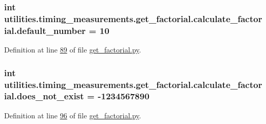 \subsubsection[{default\+\_\+number}]{\setlength{\rightskip}{0pt plus 5cm}int utilities.\+timing\+\_\+measurements.\+get\+\_\+factorial.\+calculate\+\_\+factorial.\+default\+\_\+number = 10\hspace{0.3cm}{\ttfamily [static]}}\label{classutilities_1_1timing__measurements_1_1get__factorial_1_1calculate__factorial_a52e3407bbd93719d9c77e49706a47362}


Definition at line \hyperlink{get__factorial_8py_source_l00089}{89} of file \hyperlink{get__factorial_8py_source}{get\+\_\+factorial.\+py}.

\hypertarget{classutilities_1_1timing__measurements_1_1get__factorial_1_1calculate__factorial_a16363bc4d672d6352ce3618abeb8e74f}{}
\subsubsection[{does\+\_\+not\+\_\+exist}]{\setlength{\rightskip}{0pt plus 5cm}int utilities.\+timing\+\_\+measurements.\+get\+\_\+factorial.\+calculate\+\_\+factorial.\+does\+\_\+not\+\_\+exist = -\/1234567890\hspace{0.3cm}{\ttfamily [static]}}\label{classutilities_1_1timing__measurements_1_1get__factorial_1_1calculate__factorial_a16363bc4d672d6352ce3618abeb8e74f}


Definition at line \hyperlink{get__factorial_8py_source_l00096}{96} of file \hyperlink{get__factorial_8py_source}{get\+\_\+factorial.\+py}.

\hypertarget{classutilities_1_1timing__measurements_1_1get__factorial_1_1calculate__factorial_a04cd527a2af28e713e8665e2d40b1fae}{}
